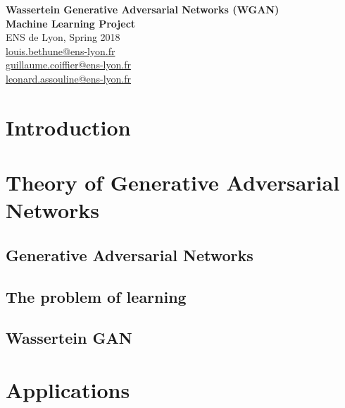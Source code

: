 \documentclass[a4paper]{report}
\begin{document}
\begin{titlepage}
\begin{center}
 {\Huge\bfseries Wassertein Generative Adversarial Networks (WGAN)\\}
 \vspace{2cm}
 {\Large \bfseries Machine Learning Project \\}
 \vspace{2cm}
 {\large ENS de Lyon, Spring 2018 \\}
 \vspace{2cm}
{\Large {} \color{black}
	\href{mailto:louis.bethune@ens-lyon.fr}{louis.bethune@ens-lyon.fr}\\
    \vspace{0.2cm}
	\href{mailto:guillaume.coiffier@ens-lyon.fr}{guillaume.coiffier@ens-lyon.fr}\\
	\vspace{0.2cm}
	\href{mailto:leonard.assouline@ens-lyon.fr}{leonard.assouline@ens-lyon.fr}\\
}
\vspace{2cm}
\vfill
\end{center}
\end{titlepage}




\setcounter{tocdepth}{1}
\tableofcontents





\chapter*{Introduction}

\lipsum

\chapter{Theory of Generative Adversarial Networks}

\section{Generative Adversarial Networks}
\lipsum[1]

\section{The problem of learning}
\lipsum[1]

\section{Wassertein GAN}
\lipsum[1]

\chapter{Applications}
\lipsum


\nocite{*}


\end{document}
